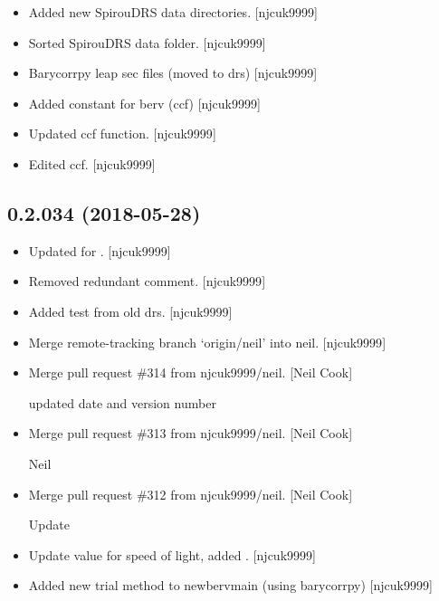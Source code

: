 \documentclass[a4paper,10pt,english]{report}
\begin{document}
\begin{itemize}
\item {} 
Added new SpirouDRS data directories. {[}njcuk9999{]}

\item {} 
Sorted SpirouDRS data folder. {[}njcuk9999{]}

\item {} 
Barycorrpy leap sec files (moved to drs) {[}njcuk9999{]}

\item {} 
Added constant for berv (ccf) {[}njcuk9999{]}

\item {} 
Updated ccf function. {[}njcuk9999{]}

\item {} 
Edited ccf. {[}njcuk9999{]}

\end{itemize}


\subsection{0.2.034 (2018-05-28)}
\label{\detokenize{misc/changelog:id429}}\begin{itemize}
\item {} 
Updated for . {[}njcuk9999{]}

\item {} 
Removed redundant comment. {[}njcuk9999{]}

\item {} 
Added test from old drs. {[}njcuk9999{]}

\item {} 
Merge remote-tracking branch ‘origin/neil’ into neil. {[}njcuk9999{]}

\item {} 
Merge pull request \#314 from njcuk9999/neil. {[}Neil Cook{]}

updated date and version number

\item {} 
Merge pull request \#313 from njcuk9999/neil. {[}Neil Cook{]}

Neil

\item {} 
Merge pull request \#312 from njcuk9999/neil. {[}Neil Cook{]}

Update 

\item {} 
Update value for speed of light, added .
{[}njcuk9999{]}

\item {} 
Added new trial method to newbervmain (using barycorrpy) {[}njcuk9999{]}

\end{itemize}
\end{document}
